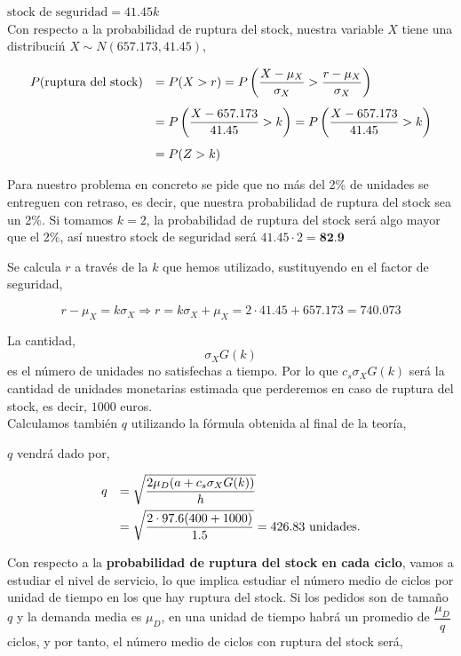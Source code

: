 \documentclass[a4paper,12pt]{article}
\begin{document}
$ \text{stock de seguridad} = 41.45 k$\\

Con respecto a la probabilidad de ruptura del stock, nuestra variable $X$ tiene una distribuci\'n $ X\sim N(657.173, 41.45)$,

\begin{equation*}
\begin{array}{l l}
 P(\text{ruptura del stock}) & =  P(X > r) = P\left(\dfrac{X - \mu_X}{\sigma_X} > \dfrac{r-\mu_X}{\sigma_X}\right) \\[0.5cm]
 \, &   = P\left(\dfrac{X - 657.173}{41.45} > k\right) = P\left(\dfrac{X - 657.173}{41.45} > k\right) \\[0.5cm]
 \, &   = P(Z > k)
\end{array}
\end{equation*}

Para nuestro problema en concreto se pide que no m\'as del 2\% de unidades se entreguen con retraso, es decir, que nuestra probabilidad de ruptura del stock sea un 2\%. Si tomamos $k = 2$, la probabilidad de ruptura del stock ser\'a algo mayor que el 2\%, as\'i nuestro stock de seguridad ser\'a $41.45 \cdot 2 = \textbf{82.9}$

Se calcula \textbf{$r$} a trav\'es de la $k$ que hemos utilizado, sustituyendo en el factor de seguridad,

$$ r - \mu_X = k\sigma_X \Rightarrow r = k\sigma_X + \mu_X = 2\cdot 41.45 + 657.173 = 740.073$$

La cantidad, $$ \sigma_X G(k)$$ es el n\'umero de unidades no satisfechas a tiempo. Por lo que $c_s\sigma_X G(k)$ ser\'a la cantidad de unidades monetarias estimada que perderemos en caso de ruptura del stock, es decir, $1000$ euros.\\

Calculamos tambi\'en $q$ utilizando la f\'ormula obtenida al final de la teor\'ia,

$q$ vendr\'a dado por,

\begin{equation*}
\begin{array}{l l}
q & =  \sqrt{\dfrac{2\mu_D (a + c_s \sigma_X G(k))}{h}} \\[.3cm]
\, & = \sqrt{\dfrac{2\cdot 97.6(400 + 1000)}{1.5}} = 426.83\text{ unidades.}
\end{array}
\end{equation*}

Con respecto a la \textbf{probabilidad de ruptura del stock en cada ciclo}, vamos a estudiar el nivel de servicio, lo que implica estudiar el n\'umero medio de ciclos por unidad de tiempo en los que hay ruptura del stock. Si los pedidos son de tama\~no $q$ y la demanda media es $\mu_D$, en una unidad de tiempo habr\'a un promedio de $\dfrac{\mu_D}{q}$ ciclos, y por tanto, el n\'umero medio de ciclos con ruptura del stock ser\'a,
\end{document}

